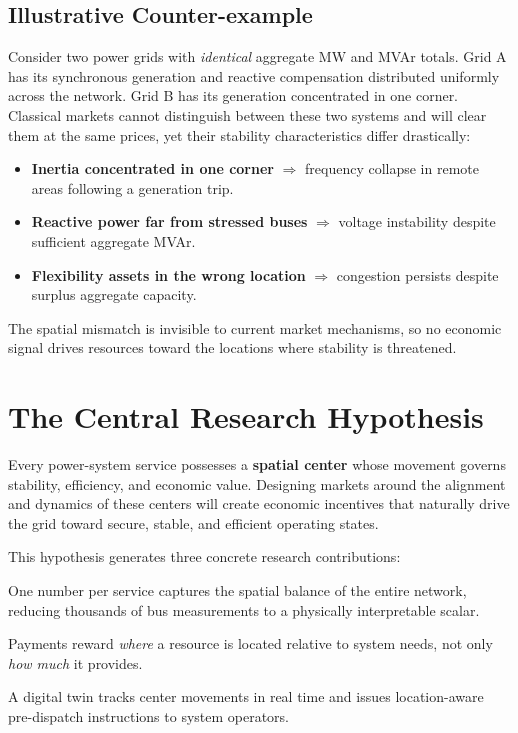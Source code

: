 \documentclass[12pt, a4paper]{article}
\begin{document}
\subsection{Illustrative Counter-example}

Consider two power grids with \emph{identical} aggregate MW and MVAr totals.
Grid A has its synchronous generation and reactive compensation distributed
uniformly across the network.
Grid B has its generation concentrated in one corner.
Classical markets cannot distinguish between these two systems and will clear
them at the same prices, yet their stability characteristics differ drastically:

\begin{itemize}[leftmargin=2em]
  \item \textbf{Inertia concentrated in one corner} $\Rightarrow$ frequency
        collapse in remote areas following a generation trip.
  \item \textbf{Reactive power far from stressed buses} $\Rightarrow$ voltage
        instability despite sufficient aggregate MVAr.
  \item \textbf{Flexibility assets in the wrong location} $\Rightarrow$
        congestion persists despite surplus aggregate capacity.
\end{itemize}

The spatial mismatch is invisible to current market mechanisms, so no economic
signal drives resources toward the locations where stability is threatened.

\section{The Central Research Hypothesis}
\label{sec:hypothesis}

\begin{hypothesis}
Every power-system service possesses a \textbf{spatial center} whose movement
governs stability, efficiency, and economic value.
Designing markets around the alignment and dynamics of these centers will
create economic incentives that naturally drive the grid toward secure, stable,
and efficient operating states.
\end{hypothesis}

This hypothesis generates three concrete research contributions:

\begin{description}[leftmargin=2em, style=nextline]
  \item[New State Variable]
        One number per service captures the spatial balance of the entire
        network, reducing thousands of bus measurements to a physically
        interpretable scalar.
  \item[New Market Signal]
        Payments reward \emph{where} a resource is located relative to system
        needs, not only \emph{how much} it provides.
  \item[New Control Layer]
        A digital twin tracks center movements in real time and issues
        location-aware pre-dispatch instructions to system operators.
\end{description}
\end{document}

